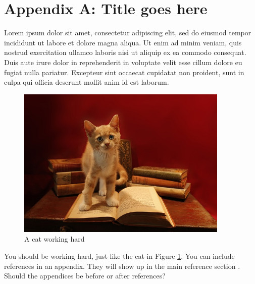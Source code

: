\appendix

\renewcommand{\thesection}{A.\arabic{section}}
\renewcommand{\thefigure}{A.\arabic{figure}}
\renewcommand{\thetable}{A.\arabic{figure}}
\renewcommand{\theequation}{A.\arabic{figure}}

\setcounter{figure}{0}
\setcounter{table}{0}
\setcounter{equation}{0}


\section*{Appendix A: Title goes here}
\label{appendix:A}

Lorem ipsum dolor sit amet, consectetur adipiscing elit, sed do eiusmod tempor incididunt ut labore et dolore magna aliqua. Ut enim ad minim veniam, quis nostrud exercitation ullamco laboris nisi ut aliquip ex ea commodo consequat. Duis aute irure dolor in reprehenderit in voluptate velit esse cillum dolore eu fugiat nulla pariatur. Excepteur sint occaecat cupidatat non proident, sunt in culpa qui officia deserunt mollit anim id est laborum.

\begin{figure}[h]
\includegraphics[width=0.9\textwidth]{Images/cat2.jpg}
\centering
\caption{A cat working hard}
\label{figure:A.1}
\end{figure}

You should be working hard, just like the cat in Figure \ref{figure:A.1}. You can include references in an appendix. They will show up in the main reference section \cite{Reference3}. Should the appendices be before or after references?
